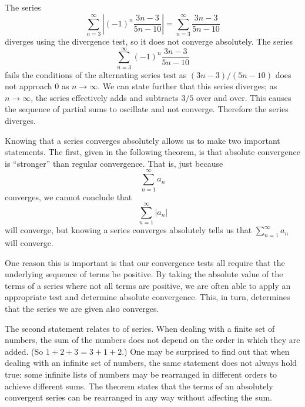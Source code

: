 \documentclass{ximera}
\begin{document}
\begin{question}
\begin{question}
\begin{question}
\begin{prompt}
\begin{multipleChoice}
        \end{multipleChoice}
        \begin{feedback}
	  The series
          \[
          \sum_{n=3}^\infty \left|(-1)^n\frac{3n-3}{5n-10}\right| =
          \sum_{n=3}^\infty \frac{3n-3}{5n-10}
          \]
          diverges using the divergence test, so it does not converge
          absolutely.  The series
          \[
          \sum_{n=3}^\infty (-1)^n\frac{3n-3}{5n-10}
          \]
          fails the conditions of the alternating series test as
          $(3n-3)/(5n-10)$ does not approach $0$ as $n\to\infty$. We
          can state further that this series diverges; as
          $n\to\infty$, the series effectively adds and subtracts
          $3/5$ over and over. This causes the sequence of partial
          sums to oscillate and not converge.  Therefore the series
          diverges.
        \end{feedback}
      \end{prompt}
    \end{question}
  \end{question}
\end{question}

Knowing that a series converges absolutely allows us to make two
important statements. The first, given in the following theorem, is
that absolute convergence is ``stronger'' than regular
convergence. That is, just because
\[
\sum_{n=1}^\infty a_n
\]
converges, we cannot conclude that
\[
\sum_{n=1}^\infty |a_n|
\]
will converge, but knowing a series converges absolutely tells us that
$\sum_{n=1}^\infty a_n$ will converge.

One reason this is important is that our convergence tests all require
that the underlying sequence of terms be positive. By taking the
absolute value of the terms of a series where not all terms are
positive, we are often able to apply an appropriate test and determine
absolute convergence. This, in turn, determines that the series we are
given also converges.

The second statement relates to  of series. When
dealing with a finite set of numbers, the sum of the numbers does not
depend on the order in which they are added. (So $1+2+3 = 3+1+2$.) One
may be surprised to find out that when dealing with an infinite set of
numbers, the same statement does not always hold true: some infinite
lists of numbers may be rearranged in different orders to achieve
different sums. The theorem states that the terms of an absolutely
convergent series can be rearranged in any way without affecting the
sum.
\end{document}
